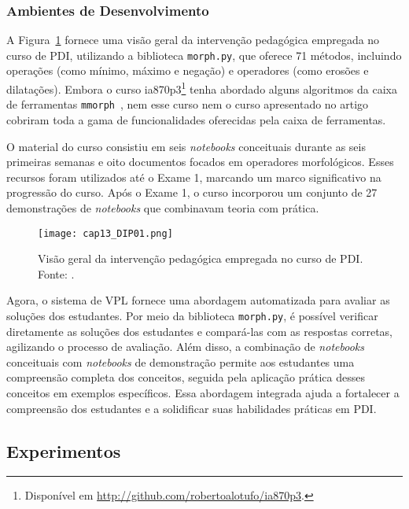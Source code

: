 \subsubsection{Ambientes de Desenvolvimento}\label{sec:development}

A Figura~\ref{fig:cap13_DIP01} fornece uma visão geral da intervenção pedagógica empregada no curso de PDI, utilizando a biblioteca \verb|morph.py|, que oferece 71 métodos, incluindo operações (como mínimo, máximo e negação) e operadores (como erosões e dilatações). Embora o curso ia870p3\footnote{Disponível em \url{http://github.com/robertoalotufo/ia870p3}.} \cite{ia898p3} tenha abordado alguns algoritmos da caixa de ferramentas \verb|mmorph|~\cite{dougherty2003hands}, nem esse curso nem o curso apresentado no artigo cobriram toda a gama de funcionalidades oferecidas pela caixa de ferramentas.

O material do curso consistiu em seis \textit{notebooks} conceituais durante as seis primeiras semanas e oito documentos focados em operadores morfológicos. Esses recursos foram utilizados até o Exame 1, marcando um marco significativo na progressão do curso. Após o Exame 1, o curso incorporou um conjunto de 27 demonstrações de \textit{notebooks} que combinavam teoria com prática.

\begin{figure}[ht]
\centering
   \texttt{[image: cap13\_DIP01.png]}
\caption{Visão geral da intervenção pedagógica empregada no curso de PDI. Fonte: \cite{2024:Zampirolli.Josko-PDI}.}
\label{fig:cap13_DIP01}
\end{figure}

Agora, o sistema de VPL fornece uma abordagem automatizada para avaliar as soluções dos estudantes. Por meio da biblioteca \verb|morph.py|, é possível verificar diretamente as soluções dos estudantes e compará-las com as respostas corretas, agilizando o processo de avaliação. Além disso, a combinação de \textit{notebooks} conceituais com \textit{notebooks} de demonstração permite aos estudantes uma compreensão completa dos conceitos, seguida pela aplicação prática desses conceitos em exemplos específicos. Essa abordagem integrada ajuda a fortalecer a compreensão dos estudantes e a solidificar suas habilidades práticas em PDI.

\subsection{Experimentos}

